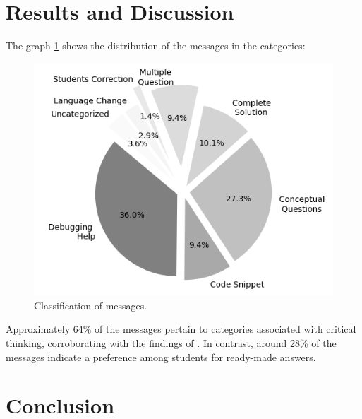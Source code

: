 \documentclass[conference]{IEEEtran}
\begin{document}
\section{Results and Discussion}

The graph \ref{fig:graph1} shows the distribution of the messages in the
categories:
\begin{figure}[h!]
    \centering
    \includegraphics[scale=0.7]{figures/figure1.png}
    \caption{Classification of messages.}
    \label{fig:graph1}
\end{figure}

Approximately 64\% of the messages pertain to categories associated with
critical thinking, corroborating with the findings of
\cite{10.1007/978-3-031-64299-9_20}. In contrast, around 28\% of the messages
indicate a preference among students for ready-made answers.

\section{Conclusion}



\end{document}
